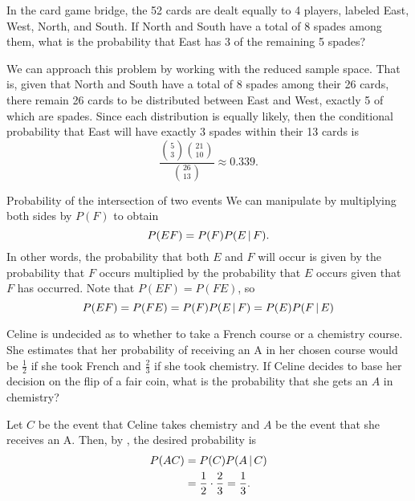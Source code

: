 \begin{changebar}
\begin{example}\label{bridgeex}
    In the card game bridge, the 52 cards are dealt equally to 4 players, labeled East, West, North, and South. If North and South have a total of 8 spades among them, what is the probability that East has 3 of the remaining 5 spades?
\end{example}
\begin{solution}
    We can approach this problem by working with the reduced sample space. That is, given that North and South have a total of 8 spades among their 26 cards, there remain 26 cards to be distributed between East and West, exactly 5 of which are spades. Since each distribution is equally likely, then the conditional probability that East will have exactly 3 spades within their 13 cards is \[
        \frac{\binom{5}{3}\binom{21}{10}}{\binom{26}{13}} \approx 0.339.    
    \] 
\end{solution}
\end{changebar}

\begin{bdef}{Probability of the intersection of two events}\label{probint}
    We can manipulate  by multiplying both sides by $P(F)$ to obtain \[
        P(EF) = P(F)P(E \,\vert\, F).    
    \]
    In other words, the probability that both $E$ and $F$ will occur is given by the probability that $F$ occurs multiplied by the probability that $E$ occurs given that $F$ has occurred. Note that $P(EF) = P(FE)$, so \[
        P(EF) = P(FE) = P(F)P(E \,\vert\, F) = P(E)P(F \,\vert\, E)    
    \]
\end{bdef}

\begin{changebar}
    \begin{example}
        Celine is undecided as to whether to take a French course or a chemistry course. She estimates that her probability of receiving an A in her chosen course would be $\frac{1}{2}$ if she took French and $\frac{2}{3}$ if she took chemistry. If Celine decides to base her decision on the flip of a fair coin, what is the probability that she gets an $A$ in chemistry?
    \end{example}
    \begin{solution}
        Let $C$ be the event that Celine takes chemistry and $A$ be the event that she receives an A. Then, by , the desired probability is \[
            \begin{aligned}
                P(AC) &= P(C)P(A \,\vert\, C) \\
                &= \frac{1}{2}\cdot\frac{2}{3} = \frac{1}{3}.
            \end{aligned}
        \]
    \end{solution}
\end{changebar}

